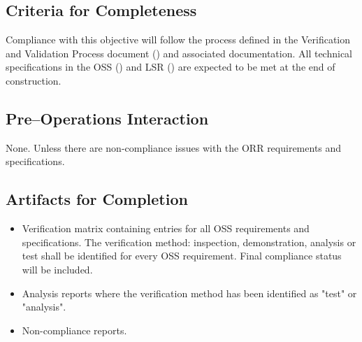 \subsection{Criteria for Completeness}
Compliance with this objective will follow the process defined in the Verification and Validation Process document () and associated documentation.  
All technical specifications in the OSS () and LSR () are expected to be met at the end of construction.

\subsection{Pre--Operations Interaction}
None. Unless there are non-compliance issues with the ORR requirements and specifications.

\subsection{Artifacts for Completion}

\begin{itemize}
 
	\item Verification matrix containing entries for all OSS requirements and specifications.  The verification method: inspection, demonstration, analysis or test shall be identified for every OSS requirement.  Final compliance status will be included.
	\item Analysis reports where the verification method has been identified as "test" or "analysis".
	\item Non-compliance reports.

\end{itemize}